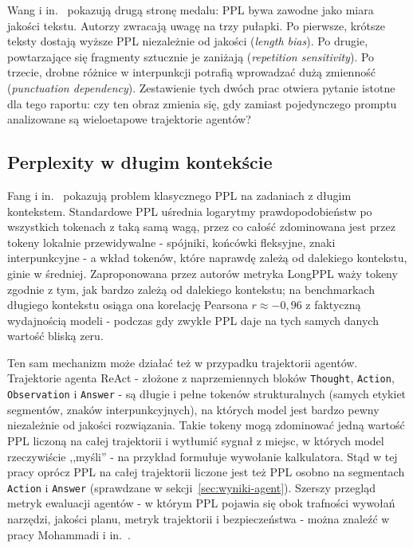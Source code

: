 Wang i in.~\cite{wang2022perplexity} pokazują drugą stronę medalu:
PPL bywa zawodne jako miara jakości tekstu. Autorzy zwracają uwagę
na trzy pułapki. Po pierwsze, krótsze teksty dostają wyższe PPL
niezależnie od jakości (\emph{length bias}). Po drugie, powtarzające
się fragmenty sztucznie je zaniżają (\emph{repetition sensitivity}).
Po trzecie, drobne różnice w interpunkcji potrafią wprowadzać dużą
zmienność (\emph{punctuation dependency}). Zestawienie tych dwóch
prac otwiera pytanie istotne dla tego raportu: czy ten obraz
zmienia się, gdy zamiast pojedynczego promptu analizowane są
wieloetapowe trajektorie agentów?

\subsection{Perplexity w długim kontekście}
\label{sec:longppl}

Fang i in.~\cite{fang2025longppl} pokazują problem klasycznego PPL
na zadaniach z długim kontekstem. Standardowe PPL uśrednia
logarytmy prawdopodobieństw po wszystkich tokenach z taką samą
wagą, przez co całość zdominowana jest przez tokeny lokalnie
przewidywalne - spójniki, końcówki fleksyjne, znaki interpunkcyjne -
a wkład tokenów, które naprawdę zależą od dalekiego kontekstu,
ginie w średniej. Zaproponowana przez autorów metryka LongPPL
waży tokeny zgodnie z tym, jak bardzo zależą od dalekiego kontekstu;
na benchmarkach długiego kontekstu osiąga ona korelację Pearsona
$r \approx -0{,}96$ z faktyczną wydajnością modeli - podczas gdy
zwykłe PPL daje na tych samych danych wartość bliską zeru.

Ten sam mechanizm może działać też w przypadku trajektorii agentów.
Trajektorie agenta ReAct - złożone z naprzemiennych bloków
\texttt{Thought}, \texttt{Action}, \texttt{Observation}
i \texttt{Answer} - są długie i pełne tokenów strukturalnych
(samych etykiet segmentów, znaków interpunkcyjnych), na których
model jest bardzo pewny niezależnie od jakości rozwiązania. Takie
tokeny mogą zdominować jedną wartość PPL liczoną na całej
trajektorii i wytłumić sygnał z miejsc, w których model
rzeczywiście ,,myśli'' - na przykład formułuje wywołanie
kalkulatora. Stąd w tej pracy oprócz PPL na całej trajektorii
liczone jest też PPL osobno na segmentach \texttt{Action}
i \texttt{Answer} (sprawdzane w sekcji~\ref{sec:wyniki-agent}).
Szerszy przegląd metryk ewaluacji agentów - w którym PPL pojawia
się obok trafności wywołań narzędzi, jakości planu, metryk
trajektorii i bezpieczeństwa - można znaleźć w pracy Mohammadi
i in.~\cite{mohammadi2025survey}.

